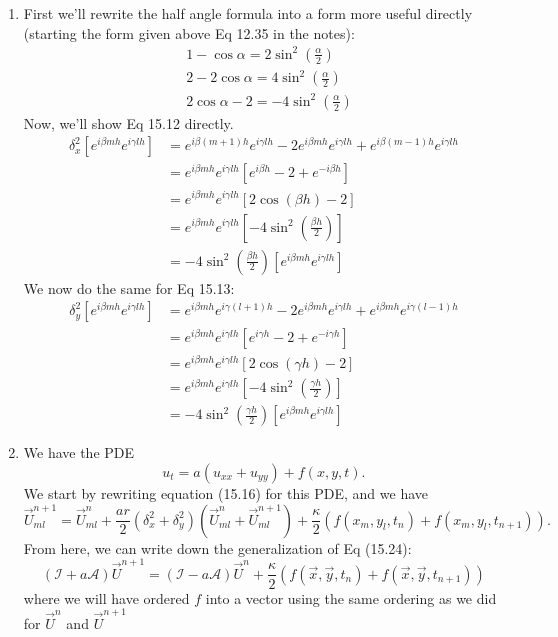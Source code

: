 \documentclass[11pt]{article}
\def\f{\frac }
\begin{document}
\begin{enumerate}
\item First we'll rewrite the half angle formula into a form more useful directly (starting the form given above Eq 12.35 in the notes):
\begin{align*} & 1-\cos \alpha = 2 \sin ^2 \left ( \f{\alpha}{2} \right ) \\
&2-2\cos \alpha = 4 \sin ^2 \left ( \f{\alpha}{2} \right ) \\
&2\cos \alpha - 2= - 4 \sin ^2 \left ( \f{\alpha}{2} \right ) \end{align*}
Now, we'll show Eq 15.12 directly.
\begin{align*} \delta _x ^2 \left [ e^{i\beta m h} e^{i\gamma l h} \right ] &= e^{i\beta (m+1) h} e^{i\gamma l h} -2 e^{i\beta m h} e^{i\gamma l h} + e^{i\beta (m-1) h} e^{i\gamma l h}\\
&= e^{i\beta m h} e^{i\gamma l h} \left [ e^{i\beta h}-2  + e^{-i\beta h} \right ]\\
&= e^{i\beta m h} e^{i\gamma l h} \left [ 2\cos (\beta h) -2 \right ]\\
&= e^{i\beta m h} e^{i\gamma l h} \left [ -4 \sin ^2 \left ( \f{\beta h}{2} \right ) \right ]\\
&= -4 \sin ^2 \left ( \f{\beta h}{2} \right )  \left [ e^{i\beta m h} e^{i\gamma l h}\right ]\end{align*}
We now do the same for Eq 15.13:
\begin{align*} \delta _y ^2 \left [ e^{i\beta m h} e^{i\gamma l h} \right ] &= e^{i\beta m h} e^{i\gamma (l+1) h} -2 e^{i\beta m h} e^{i\gamma l h} + e^{i\beta m h} e^{i\gamma (l-1) h}\\
&= e^{i\beta m h} e^{i\gamma l h} \left [ e^{i\gamma h}-2  + e^{-i\gamma h} \right ]\\
&= e^{i\beta m h} e^{i\gamma l h} \left [ 2\cos (\gamma h) -2 \right ]\\
&= e^{i\beta m h} e^{i\gamma l h} \left [ -4 \sin ^2 \left ( \f{\gamma h}{2} \right ) \right ]\\
&= -4 \sin ^2 \left ( \f{\gamma h}{2} \right )  \left [ e^{i\beta m h} e^{i\gamma l h}\right ]\end{align*}

\item We have the PDE
\[ u_t = a \left ( u_{xx} + u_{yy} \right ) + f(x,y,t). \]
We start by rewriting equation (15.16) for this PDE, and we have
\[ \vec{U} _{ml} ^{n+1} = \vec{U} _{ml} ^{n} + \f{ar}{2} \left ( \delta _x ^2 + \delta _y ^2 \right )  \left ( \vec{U} _{ml} ^{n} + \vec{U} _{ml} ^{n+1} \right ) + \f{\kappa}{2} \left ( f(x_m,y_l,t_n ) + f(x_m,y_l,t_{n+1}  ) \right ) .\]
From here, we can write down the generalization of Eq (15.24):
\[ \left ( \mathcal{I} + a\mathcal{A} \right) \vec{U} ^{n+1}  = \left ( \mathcal{I} - a\mathcal{A} \right) \vec{U} ^n + \f{\kappa}{2} \left ( f(\vec{x},\vec{y},t_n ) + f(\vec{x}, \vec{y},t_{n+1}  ) \right ) \]
where we will have ordered $f$ into a vector using the same ordering as we did for $\vec{U}^n$ and $\vec{U}^{n+1}$


\end{enumerate}
\end{document}
